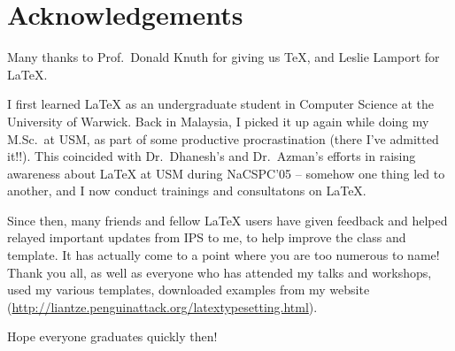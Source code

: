 \chapter{Acknowledgements}

Many thanks to Prof.~Donald Knuth for giving us \TeX, and Leslie Lamport for \LaTeX.  

I first learned \LaTeX{} as an undergraduate student in Computer Science at the University of Warwick. Back in Malaysia, I picked it up again while doing my M.Sc.~at USM, as part of some productive procrastination (there I've admitted it!!). This coincided with Dr.~Dhanesh's and Dr.~Azman's efforts in raising awareness about \LaTeX{} at USM during NaCSPC'05 -- somehow one thing led to another, and I now conduct trainings and consultatons on \LaTeX. \Smiley

Since then, many friends and fellow \LaTeX{} users have given feedback and helped relayed important updates from IPS to me, to help improve the class and template. It has actually come to a point where you are too numerous to name! Thank you all, as well as everyone who has attended my talks and workshops, used my various templates, downloaded examples from my website (\url{http://liantze.penguinattack.org/latextypesetting.html}).

Hope everyone graduates quickly then!


